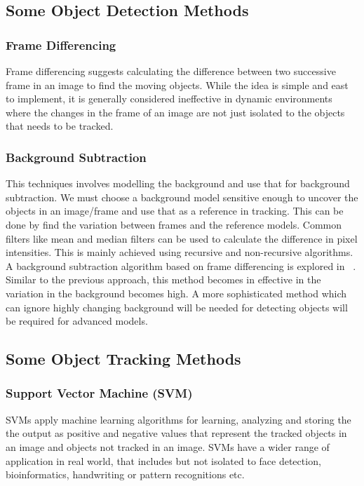 \documentclass[10pt,twocolumn,letterpaper]{article}
\begin{document}
\subsection{Some Object Detection Methods}

\subsubsection{Frame Differencing}
Frame differencing suggests calculating the difference between two successive frame in an image to find the moving objects. While the idea is simple and east to implement, it is generally considered ineffective in dynamic environments where the changes in the frame of an image are not just isolated to the objects that needs to be tracked.

\subsubsection{Background Subtraction}
This techniques involves modelling the background and use that for background subtraction. We must choose a background model sensitive enough to uncover the objects in an image/frame and use that as a reference in tracking. This can be done by find the variation between frames and the reference models. Common filters like mean and median filters can be used to calculate the difference in pixel intensities. This is mainly achieved using recursive and non-recursive algorithms. A background subtraction algorithm based on frame differencing is explored in ~\cite{literaturereview}.  Similar to the previous approach, this method becomes in effective in the variation in the background becomes high. A more sophisticated method which can ignore highly changing  background will be needed for detecting objects will be required for advanced models.

\subsection{Some Object Tracking Methods}

\subsubsection{Support Vector Machine (SVM)}
SVMs apply machine learning algorithms for learning, analyzing and storing the the output as positive and negative values that represent the tracked objects in an image and objects not tracked in an image. SVMs have a wider range of application in real world, that includes but not isolated to face detection, bioinformatics, handwriting or pattern recognitions etc.
\end{document}
